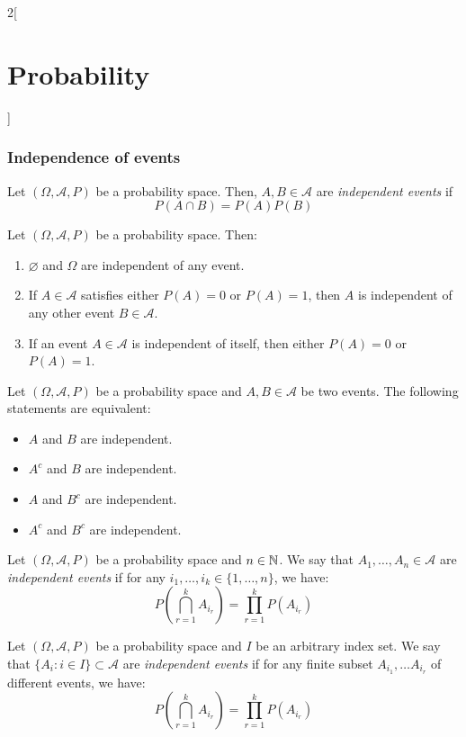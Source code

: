 \documentclass[../../../main.tex]{subfiles}
\begin{document}
\begin{multicols}{2}[\section{Probability}]
  \subsubsection{Independence of events}
  \begin{definition}
    Let $(\Omega,\mathcal{A},P)$ be a probability space. Then, $A,B\in\mathcal{A}$ are \textit{independent events} if $$P(A\cap B)=P(A)P(B)$$
  \end{definition}
  \begin{prop}
    Let $(\Omega,\mathcal{A},P)$ be a probability space. Then:
    \begin{enumerate}
      \item $\varnothing$ and $\Omega$ are independent of any event.
      \item If $A\in\mathcal{A}$ satisfies either $P(A)=0$ or $P(A)=1$, then $A$ is independent of any other event $B\in\mathcal{A}$.
      \item If an event $A\in\mathcal{A}$ is independent of itself, then either $P(A)=0$ or $P(A)=1$.
    \end{enumerate}
  \end{prop}
  \begin{prop}
    Let $(\Omega,\mathcal{A},P)$ be a probability space and $A,B\in\mathcal{A}$ be two events. The following statements are equivalent:
    \begin{itemize}
      \item $A$ and $B$ are independent.
      \item $A^c$ and $B$ are independent.
      \item $A$ and $B^c$ are independent.
      \item $A^c$ and $B^c$ are independent.
    \end{itemize}
  \end{prop}
  \begin{definition}
    Let $(\Omega,\mathcal{A},P)$ be a probability space and $n\in\mathbb{N}$. We say that $A_1,\ldots,A_n\in\mathcal{A}$ are \textit{independent events} if for any $i_1,\ldots,i_k\in\{1,\ldots,n\}$, we have: $$P\left(\bigcap_{r=1}^kA_{i_r}\right)=\prod_{r=1}^kP(A_{i_r})$$
  \end{definition}
  \begin{definition}
    Let $(\Omega,\mathcal{A},P)$ be a probability space and $I$ be an arbitrary index set. We say that $\{A_i:i\in I\}\subset\mathcal{A}$ are \textit{independent events} if for any finite subset $A_{i_1},\ldots A_{i_r}$ of different events, we have: $$P\left(\bigcap_{r=1}^kA_{i_r}\right)=\prod_{r=1}^kP(A_{i_r})$$
  \end{definition}

\end{multicols}
\end{document}
